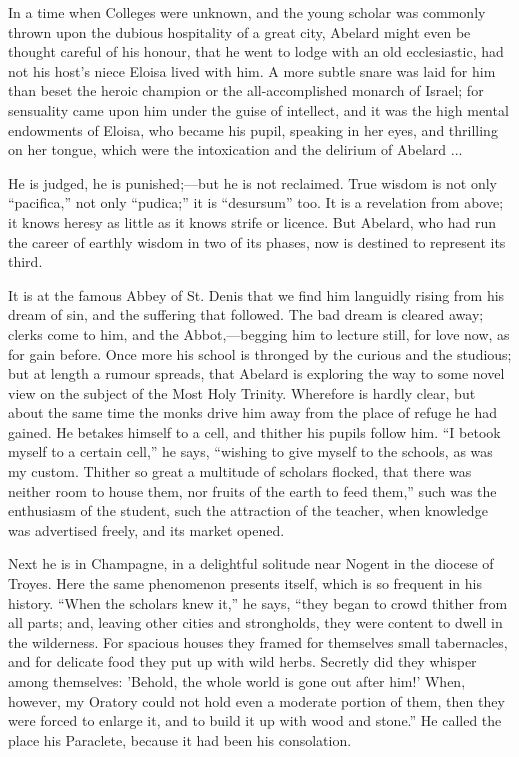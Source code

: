 In a time when Colleges were
unknown, and the young scholar was commonly thrown upon the dubious
hospitality of a great city, Abelard might even be thought careful of
his honour, that he went to lodge with an old ecclesiastic, had not
his host's niece Eloisa lived with him. A more subtle snare was laid
for him than beset the heroic champion or the all-accomplished
monarch of Israel; for sensuality came upon him under the guise of
intellect, and it was the high mental endowments of Eloisa, who became
his pupil, speaking in her eyes, and thrilling on her tongue, which
were the intoxication and the delirium of Abelard ...

He is judged, he is
punished;—but he is not reclaimed. True wisdom is not only ``pacifica,''
not only ``pudica;'' it is ``desursum'' too. It is a revelation
from above; it knows heresy as little as it knows strife or licence.
But Abelard, who had run the career of earthly wisdom in two of its
phases, now is destined to represent its third.

It is at the famous Abbey of
St. Denis that we find him languidly rising from his dream of sin, and
the suffering that followed. The bad dream is cleared away; clerks
come to him, and the Abbot,—begging him to lecture still, for love
now, as for gain before. Once more his school is thronged by the
curious and the studious; but at length a rumour spreads, that Abelard
is exploring the way to some novel view on the subject of the Most
Holy Trinity. Wherefore is hardly clear, but about the same time the
monks drive him away from the place of refuge he had gained. He
betakes himself to a cell, and thither his pupils follow him. ``I
betook myself to a certain cell,'' he says, ``wishing to give myself
to the schools, as was my custom. Thither so great a multitude of
scholars flocked, that there was neither room to house them, nor
fruits of the earth to feed them,'' such was the enthusiasm of the
student, such the attraction of the teacher, when knowledge was
advertised freely, and its market opened.

Next he is in Champagne, in a
delightful solitude near Nogent in the diocese of Troyes. Here the
same phenomenon presents itself, which is so frequent in his history. ``When the scholars knew it,'' he says, ``they began to
crowd thither from all parts; and, leaving other cities and
strongholds, they were content to dwell in the wilderness. For
spacious houses they framed for themselves small tabernacles, and for
delicate food they put up with wild herbs. Secretly did they whisper
among themselves: 'Behold, the whole world is gone out after him!'
When, however, my Oratory could not hold even a moderate portion of
them, then they were forced to enlarge it, and to build it up with
wood and stone.'' He called the place his Paraclete, because it had
been his consolation.

